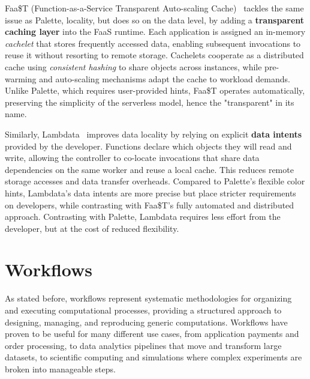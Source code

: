 Faa\$T (Function-as-a-Service Transparent Auto-scaling Cache)~\cite{faast_caching} tackles the same issue as Palette, locality, but does so on the data level, by adding a \textbf{transparent caching layer} into the FaaS runtime. Each application is assigned an in-memory \textit{cachelet} that stores frequently accessed data, enabling subsequent invocations to reuse it without resorting to remote storage. Cachelets cooperate as a distributed cache using \textit{consistent hashing} to share objects across instances, while pre-warming and auto-scaling mechanisms adapt the cache to workload demands. Unlike Palette, which requires user-provided hints, Faa\$T operates automatically, preserving the simplicity of the serverless model, hence the "transparent" in its name.

Similarly, Lambdata~\cite{lambdata_intents} improves data locality by relying on explicit \textbf{data intents} provided by the developer. Functions declare which objects they will read and write, allowing the controller to co-locate invocations that share data dependencies on the same worker and reuse a local cache. This reduces remote storage accesses and data transfer overheads. Compared to Palette's flexible color hints, Lambdata's data intents are more precise but place stricter requirements on developers, while contrasting with Faa\$T's fully automated and distributed approach. Contrasting with Palette, Lambdata requires less effort from the developer, but at the cost of reduced flexibility.

\section{Workflows}
As stated before, workflows represent systematic methodologies for organizing and executing computational processes, providing a structured approach to designing, managing, and reproducing generic computations. Workflows have proven to be useful for many different use cases, from application payments and order processing, to data analytics pipelines that move and transform large datasets, to scientific computing and simulations where complex experiments are broken into manageable steps. 

